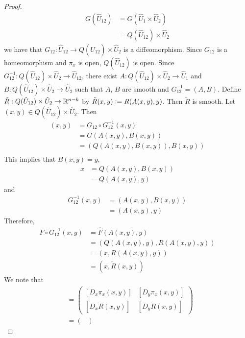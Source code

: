 \documentclass{book}
\begin{document}
\begin{proof}
		\begin{align*}
			G(\hat{U}_{12})
			& = G(\hat{U}_1 \times \hat{U}_2) \\
			& = Q(\hat{U}_{12}) \times \hat{U}_2
		\end{align*}
		 we have that  $G_{12}: \hat{U}_{12} \rightarrow Q(\hat{U}_{12}) \times \hat{U}_2$ is a diffeomorphism. Since $G_{12}$ is a homeomorphism and $\pi_x$ is open, $Q(\hat{U}_{12})$ is open. Since $G_{12}^{-1}: Q(\hat{U}_{12}) \times \hat{U}_2 \rightarrow  \hat{U}_{12}$, there exist $A: Q(\hat{U}_{12}) \times \hat{U}_2 \rightarrow \hat{U}_1$ and $B: Q(\hat{U}_{12}) \times \hat{U}_2 \rightarrow \hat{U}_2$ such that $A$, $B$ are smooth and $G_{12}^{-1} = (A, B)$. Define $\tilde{R}: Q(\hat{U}_{12}) \times \hat{U}_2 \rightarrow \mathbb{R}^{n-k}$ by $\tilde{R}(x,y) \vcentcolon= R(A(x,y), y)$. Then $\tilde{R}$ is smooth. Let $(x,y) \in Q(\hat{U}_{12}) \times \hat{U}_2$. Then
		\begin{align*}
			(x,y)
			& = G_{12} \circ G_{12}^{-1}(x,y) \\
			& = G(A(x,y), B(x,y)) \\
			& = (Q(A(x,y), B(x,y)), B(x,y)) \\
		\end{align*}
		This implies that $B(x,y) = y$, 
		\begin{align*}
			x
			& = Q(A(x,y), B(x,y)) \\
			& = Q(A(x,y), y)
		\end{align*}
		and 
		\begin{align*}
			G_{12}^{-1}(x,y) 
			& = (A(x,y), B(x,y)) \\
			& = (A(x,y), y)
		\end{align*}
		Therefore, 
		\begin{align*}
			\hat{F} \circ G_{12}^{-1}(x,y) 
			& = \hat{F}(A(x,y), y) \\
			& = (Q(A(x,y), y), R(A(x,y), y)) \\
			& = (x, R(A(x,y), y)) \\
			& = (x, \tilde{R}(x, y))
		\end{align*}
		We note that 
		\begin{align*}
			[D(\hat{F} \circ G_{12}^{-1})(x,y)]
			& = 
			\begin{pmatrix}
				[D_x \pi_x(x,y)] & [D_y \pi_x(x,y)] \\
				[D_x \tilde{R}(x,y)]    & [D_y \tilde{R}(x,y)]   
			\end{pmatrix} \\
			& = 
			\begin{pmatrix}

\end{pmatrix}
\end{align*}
\end{proof}
\end{document}
